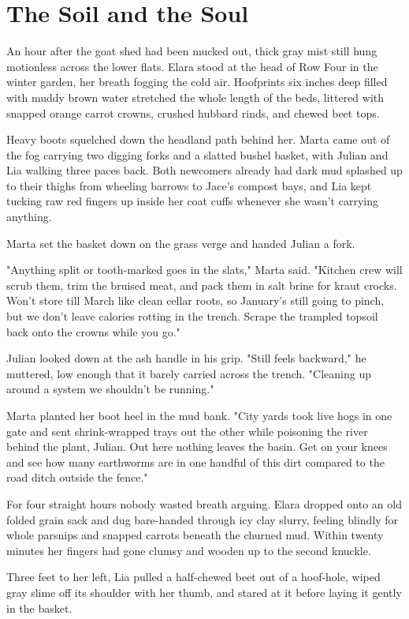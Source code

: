 \chapter{The Soil and the Soul}

An hour after the goat shed had been mucked out, thick gray mist still hung motionless across the lower flats. Elara stood at the head of Row Four in the winter garden, her breath fogging the cold air. Hoofprints six inches deep filled with muddy brown water stretched the whole length of the beds, littered with snapped orange carrot crowns, crushed hubbard rinds, and chewed beet tops.

Heavy boots squelched down the headland path behind her. Marta came out of the fog carrying two digging forks and a slatted bushel basket, with Julian and Lia walking three paces back. Both newcomers already had dark mud splashed up to their thighs from wheeling barrows to Jace's compost bays, and Lia kept tucking raw red fingers up inside her coat cuffs whenever she wasn't carrying anything.

Marta set the basket down on the grass verge and handed Julian a fork.

"Anything split or tooth-marked goes in the slats," Marta said. "Kitchen crew will scrub them, trim the bruised meat, and pack them in salt brine for kraut crocks. Won't store till March like clean cellar roots, so January's still going to pinch, but we don't leave calories rotting in the trench. Scrape the trampled topsoil back onto the crowns while you go."

Julian looked down at the ash handle in his grip. "Still feels backward," he muttered, low enough that it barely carried across the trench. "Cleaning up around a system we shouldn't be running."

Marta planted her boot heel in the mud bank. "City yards took live hogs in one gate and sent shrink-wrapped trays out the other while poisoning the river behind the plant, Julian. Out here nothing leaves the basin. Get on your knees and see how many earthworms are in one handful of this dirt compared to the road ditch outside the fence."

For four straight hours nobody wasted breath arguing. Elara dropped onto an old folded grain sack and dug bare-handed through icy clay slurry, feeling blindly for whole parsnips and snapped carrots beneath the churned mud. Within twenty minutes her fingers had gone clumsy and wooden up to the second knuckle.

Three feet to her left, Lia pulled a half-chewed beet out of a hoof-hole, wiped gray slime off its shoulder with her thumb, and stared at it before laying it gently in the basket.

